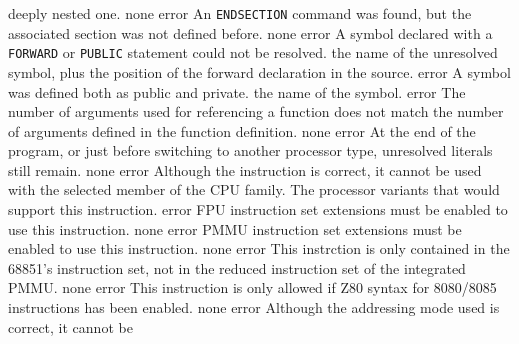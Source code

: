 \documentclass[12pt,twoside]{report}
\newcommand{\tty}[1]{{\tt #1}}
\begin{document}
\begin{description}
{                deeply nested one.}
               {none}
               {error}
               {An \tty{ENDSECTION} command was found, but the associated section
                was not defined before.}
               {none}
               {error}
               {A symbol declared with a \tty{FORWARD} or \tty{PUBLIC} statement could
                not be resolved.}
               {the name of the unresolved symbol, plus the
                position of the forward declaration in the
                source.}
               {error}
               {A symbol was defined both as public and private.}
               {the name of the symbol.}
               {error}
               {The number of arguments used for referencing a function
                does not match the number of arguments defined in the
                function definition.}
               {none}
               {error}
               {At the end of the program, or just before switching to
                another processor type, unresolved literals still remain.}
               {none}
               {error}
               {Although the instruction is correct, it cannot be used with
                the selected member of the CPU family.}
               {The processor variants that would support this
                instruction.}
               {error}
               {FPU instruction set extensions must be enabled to
                use this instruction.}
               {none}
               {error}
               {PMMU instruction set extensions must be enabled
                to use this instruction.}
               {none}
               {error}
               {This instrction is only contained in the 68851's
                instruction set, not in the reduced instruction
                set of the integrated PMMU.}
               {none}
               {error}
               {This instruction is only allowed if Z80 syntax
                for 8080/8085 instructions has been enabled.}
               {none}
               {error}
               {Although the addressing mode used is correct, it cannot be
}
\end{description}
\end{document}
